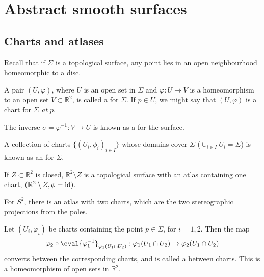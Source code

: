 \section{Abstract smooth surfaces}

\subsection{Charts and atlases}
Recall that if $\Sigma$ is a topological surface, any point lies in an open neighbourhood homeomorphic to a disc.

\begin{definition}[Chart]
	A pair $(U, \varphi)$, where $U$ is an open set in $\Sigma$ and $\varphi \colon U \to V$ is a homeomorphism to an open set $V \subset \mathbb R^2$, is called a  for $\Sigma$.
	If $p \in U$, we might say that $(U, \varphi)$ is a chart for $\Sigma$ \textit{at $p$}.
\end{definition}

\begin{definition}
	The inverse $\sigma = \varphi^{-1} \colon V \to U$ is known as a  for the surface.
\end{definition} 

\begin{definition}[Atlas]
	A collection of charts $\{ (U_i, \phi_i)_{i \in I}\}$ whose domains cover $\Sigma$ ($\cup_{i \in I} U_i = \Sigma$) is known as an  for $\Sigma$.
\end{definition} 

\begin{example}
	If $Z \subset \mathbb R^2$ is closed, $\mathbb R^2 \setminus Z$ is a topological surface with an atlas containing one chart, $(\mathbb R^2 \setminus Z, \phi = \operatorname{id})$.
\end{example}

\begin{example}
	For $S^2$, there is an atlas with two charts, which are the two stereographic projections from the poles.
\end{example} 

\begin{definition}
	Let $(U_i, \varphi_i)$ be charts containing the point $p \in \Sigma$, for $i = 1, 2$.
	Then the map
	\begin{align*}
		\varphi_2 \circ \eval{\varphi_1^{-1}}_{\varphi_1(U_1 \cap U_2)} : \varphi_1(U_1 \cap U_2) \to \varphi_2(U_1 \cap U_2)
	\end{align*}
	converts between the corresponding charts, and is called a  between charts.
	This is a homeomorphism of open sets in $\mathbb R^2$.
\end{definition}

